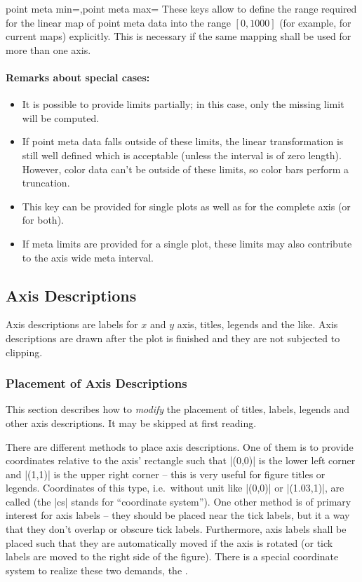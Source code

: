 \begin{pgfplotskeylist}{point meta min=,point meta max=}
	These keys allow to define the range required for the linear map of point meta data into the range $[0,1000]$ (for example, for current maps) explicitly. This is necessary if the same mapping shall be used for more than one axis.

	\paragraph{Remarks about special cases:}
	\begin{itemize}
		\item It is possible to provide limits partially; in this case, only the missing limit will be computed.
		\item If point meta data falls outside of these limits, the linear transformation is still well defined which is acceptable (unless the interval is of zero length). However, color data can't be outside of these limits, so color bars perform a truncation.
		\item This key can be provided for single plots as well as for the complete axis (or for both).
		\item If meta limits are provided for a single plot, these limits may also contribute to the axis wide meta interval.
	\end{itemize}
\end{pgfplotskeylist}




\subsection{Axis Descriptions}
Axis descriptions are labels for $x$ and $y$ axis, titles, legends and the like. Axis descriptions are drawn after the plot is finished and they are not subjected to clipping. 

\subsubsection{Placement of Axis Descriptions}
This section describes how to \emph{modify} the placement of titles, labels, legends and other axis descriptions. It may be skipped at first reading.

There are different methods to place axis descriptions. One of them is to provide coordinates relative to the axis' rectangle such that |(0,0)| is the lower left corner and |(1,1)| is the upper right corner -- this is very useful for figure titles or legends. Coordinates of this type, i.e.\ without unit like |(0,0)| or |(1.03,1)|, are called  (the |cs| stands for ``coordinate system''). One other method is of primary interest for axis labels -- they should be placed near the tick labels, but it a way that they don't overlap or obscure tick labels. Furthermore, axis labels shall be placed such that they are automatically moved if the axis is rotated (or tick labels are moved to the right side of the figure). There is a special coordinate system to realize these two demands, the .

